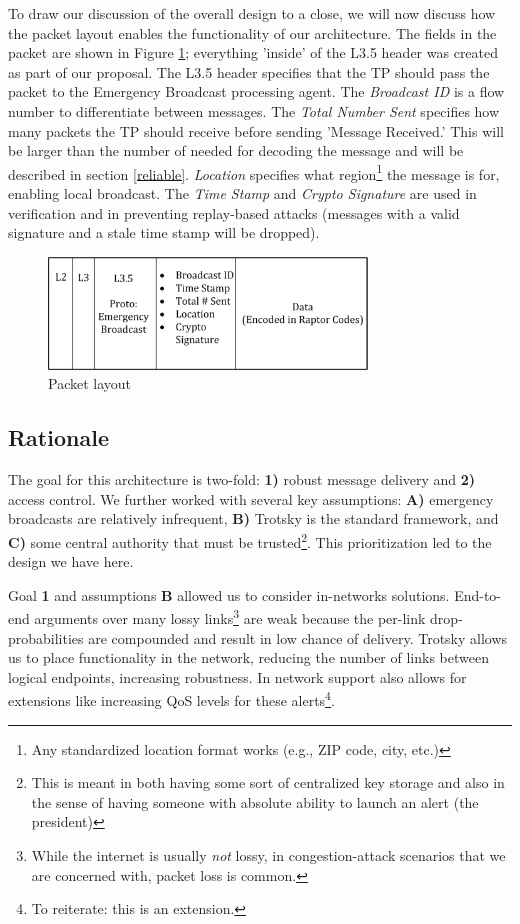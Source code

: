 To draw our discussion of the overall design to a close, we will now discuss how the packet layout enables the functionality of our architecture. The fields in the packet are shown in Figure \ref{fig:pckt}; everything 'inside' of the L3.5 header was created as part of our proposal. The L3.5 header specifies that the TP should pass the packet to the Emergency Broadcast processing agent. The\textit{ Broadcast ID} is a  flow number to differentiate between messages. The \textit{Total Number Sent} specifies how many packets the TP should receive before sending 'Message Received.' This will be larger than the number of needed for decoding the message and will be described in section \ref{reliable}. \textit{Location} specifies what region\footnote{Any standardized location format works (e.g., ZIP code, city, etc.)} the message is for, enabling local broadcast. The \textit{Time Stamp} and \textit{Crypto Signature} are used in verification and in preventing replay-based attacks (messages with a valid signature and a stale time stamp will be dropped).
\begin{figure}[tp]
\centering
\includegraphics[width=8.5cm]{figures/packet_header.png}
\caption{Packet layout}
\label{fig:pckt}
\end{figure}

\subsection{Rationale}
The goal for this architecture is two-fold: \textbf{1)} robust message delivery and \textbf{2)} access control. We further worked with several key assumptions:  \textbf{A)} emergency broadcasts are relatively infrequent, \textbf{B)} Trotsky is the standard framework, and \textbf{C)} some central authority that must be trusted\footnote{This is meant in both having some sort of centralized key storage and also in the sense of having someone with absolute ability to launch an alert (the president)}. This prioritization led to the design we have here.  

Goal \textbf{1} and assumptions \textbf{B} allowed us to consider in-networks solutions. End-to-end arguments over many lossy links\footnote{While the internet is usually \textit{not} lossy, in congestion-attack scenarios that we are concerned with, packet loss is common.} are weak because the per-link drop-probabilities are compounded and result in low chance of delivery. Trotsky allows us to place functionality in the network, reducing the number of links between logical endpoints, increasing robustness. In network support also allows for extensions like increasing QoS levels for these alerts\footnote{To reiterate: this is an extension.}. 

